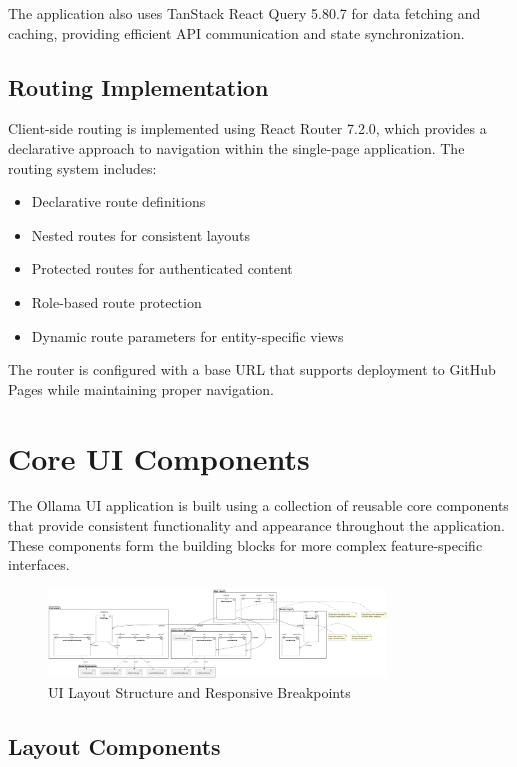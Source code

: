 The application also uses TanStack React Query 5.80.7 for data fetching and caching, providing efficient API communication and state synchronization.

\subsection{Routing Implementation}

Client-side routing is implemented using React Router 7.2.0, which provides a declarative approach to navigation within the single-page application. The routing system includes:

\begin{itemize}
  \item Declarative route definitions
  \item Nested routes for consistent layouts
  \item Protected routes for authenticated content
  \item Role-based route protection
  \item Dynamic route parameters for entity-specific views
\end{itemize}

The router is configured with a base URL that supports deployment to GitHub Pages while maintaining proper navigation.

\section{Core UI Components}

The Ollama UI application is built using a collection of reusable core components that provide consistent functionality and appearance throughout the application. These components form the building blocks for more complex feature-specific interfaces.

\begin{figure}[h]
    \centering
    \includegraphics[width=0.8\textwidth]{./Chapter07/figures/ui_layout_structure.png}
    \caption{UI Layout Structure and Responsive Breakpoints}
    \label{fig:ui-layout-structure}
\end{figure}

\subsection{Layout Components}

